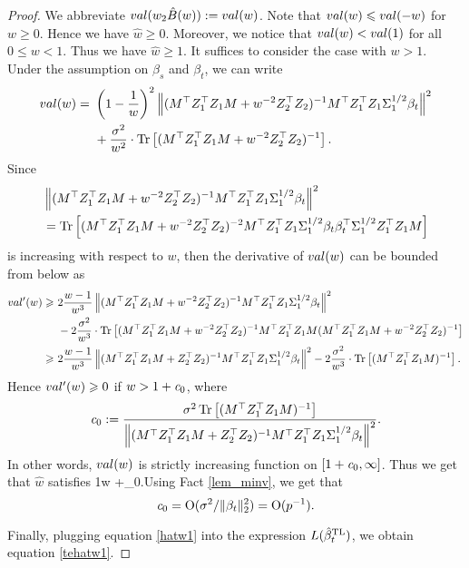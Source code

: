 \begin{proof}
We abbreviate $val(w_2\hat{B}(w)):=val(w)$. Note that $val(w)\leqslant val(-w)$ for $w\ge 0$. Hence we have $\hat w\ge 0$. Moreover, we notice that $val (w) < val (1)$ for all $0\le w < 1$. Thus we have $\hat w\ge 1$. It suffices to consider the case with $w> 1$. Under the assumption on $\beta_s$ and $\beta_t$, we can write
\begin{align}
	val(w) =&~  \left( 1-\frac1w\right)^2 \left\|( M^\top Z_1^{\top}Z_1 M + w^{-2}Z_2^{\top}Z_2)^{-1} M^\top Z_1^{\top} Z_1 \Sigma_1^{1/2}\beta_t \right\|^2 \nonumber \\
			&~ + \frac{\sigma^2}{w^2} \cdot \operatorname{Tr}\left[( M^\top Z_1^{\top}Z_1 M + w^{-2}Z_2^{\top}Z_2)^{-1} \right]. \nonumber
\end{align}
Since
\begin{align*}
&\left\|( M^\top Z_1^{\top}Z_1 M + w^{-2}Z_2^{\top}Z_2)^{-1} M^\top Z_1^{\top} Z_1 \Sigma_1^{1/2}\beta_t \right\|^2 \\
&= \operatorname{Tr} \left[ ( M^\top Z_1^{\top}Z_1 M + w^{-2}Z_2^{\top}Z_2)^{-2}M^\top Z_1^{\top} Z_1 \Sigma_1^{1/2}\beta_t\beta_t^\top \Sigma_1^{1/2}Z_1^{\top} Z_1  M\right]
\end{align*}
is increasing with respect to $w$, then the derivative of $val(w)$ can be bounded from below as
\begin{align*}
val'(w) \geqslant &~ 2\frac{w-1}{w^3} \left\|( M^\top Z_1^{\top}Z_1 M + w^{-2}Z_2^{\top}Z_2)^{-1} M^\top Z_1^{\top} Z_1 \Sigma_1^{1/2}\beta_t \right\|^2   \\
			&~ - 2 \frac{\sigma^2}{w^3} \cdot \operatorname{Tr}\left[(M^\top Z_1^{\top}Z_1 M +w^{-2}  Z_2^{\top}Z_2)^{-1} M^\top Z_1^{\top}Z_1 M (M^\top Z_1^{\top}Z_1 M + w^{-2} Z_2^{\top}Z_2)^{-1}\right] \\
\geqslant &~ 2\frac{w-1}{w^3} \left\|( M^\top Z_1^{\top}Z_1 M +  Z_2^{\top}Z_2)^{-1} M^\top Z_1^{\top} Z_1 \Sigma_1^{1/2}\beta_t \right\|^2   - 2 \frac{\sigma^2}{w^3} \cdot \operatorname{Tr}\left[(M^\top Z_1^{\top}Z_1 M)^{-1}\right].
\end{align*}
Hence $val'(w)\geqslant 0$ if $w>1+ {\mathit{c}}_0$, where
$${\mathit{c}}_0:= \frac{\sigma^2  \operatorname{Tr}\left[(M^\top Z_1^{\top}Z_1 M)^{-1}\right] }{\left\|( M^\top Z_1^{\top}Z_1 M + Z_2^{\top}Z_2)^{-1} M^\top Z_1^{\top} Z_1 \Sigma_1^{1/2}\beta_t \right\|^2}.$$
In other words, $val(w)$ is strictly increasing function on $[1+{\mathit{c}}_0,\infty]$. Thus we get that $\hat w$ satisfies
\be\label{hatw1}1\le w +\e_0.\ee Using Fact \ref{lem_minv}, we get that
$${\mathit{c}}_0=\operatorname{O}(\sigma^2/\|\beta_t\|_2^2)=\operatorname{O}(p^{-1}).$$

Finally, plugging equation \eqref{hatw1} into the expression $L(\hat{\beta}^{\text{TL}}_{t}) $, we obtain equation \eqref{tehatw1}.
\end{proof}



